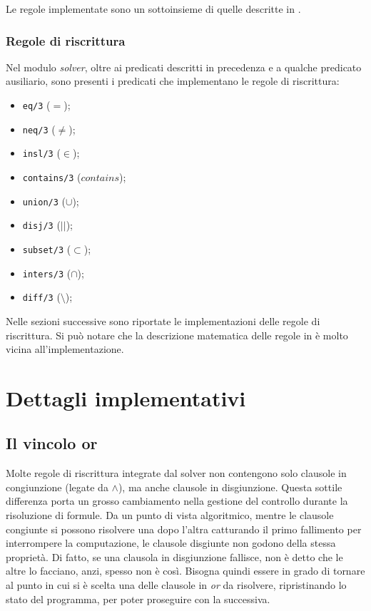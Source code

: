 \documentclass[12pt,a4paper,openright]{book} %
\begin{document}
Le regole implementate sono un sottoinsieme di quelle descritte in \cite{Rossi18}.

\subsection{Regole di riscrittura}
\label{sec:lsetpicat_solver_rewriterules}

Nel modulo \emph{solver}, oltre ai predicati descritti in precedenza e a qualche predicato ausiliario, sono presenti i predicati che implementano le regole di riscrittura:
\begin{itemize}
\item \verb|eq/3| ($=$);
\item \verb|neq/3| ($\neq$);
\item \verb|insl/3| ($\in$);
\item \verb|contains/3| ($contains$);
\item \verb|union/3| ($\cup$);
\item \verb|disj/3| ($||$);
\item \verb|subset/3| ($\subset$);
\item \verb|inters/3| ($\cap$);
\item \verb|diff/3| ($\setminus$);
\end{itemize}

Nelle sezioni successive sono riportate le implementazioni delle regole di riscrittura. Si può notare che la descrizione matematica delle regole in \cite{Rossi18} è molto vicina all'implementazione.


\chapter{Dettagli implementativi}

\section{Il vincolo or}

Molte regole di riscrittura integrate dal solver non contengono solo clausole in congiunzione (legate da $\land$), ma anche clausole in disgiunzione. Questa sottile differenza porta un grosso cambiamento nella gestione del controllo durante la risoluzione di formule. Da un punto di vista algoritmico, mentre le clausole congiunte si possono risolvere una dopo l'altra catturando il primo fallimento per interrompere la computazione, le clausole disgiunte non godono della stessa proprietà. Di fatto, se una clausola in disgiunzione fallisce, non è detto che le altre lo facciano, anzi, spesso non è così. Bisogna quindi essere in grado di tornare al punto in cui si è scelta una delle clausole in \emph{or} da risolvere, ripristinando lo stato del programma, per poter proseguire con la successiva.
\end{document}
